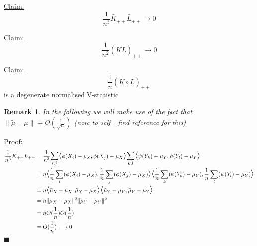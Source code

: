 \documentclass{article}
\newtheorem*{remark}{Remark}
\newenvironment{claim}[1]{\par\noindent\underline{Claim:}\space#1}{}
\newenvironment{claimproof}[1]{\par\noindent\underline{Proof:}\space#1}{\hfill $\blacksquare$}
\begin{document}
\begin{claim}[1]
\[\frac{1}{n^3}\bar{K}_{++}\bar{L}_{++} \longrightarrow 0\]
\end{claim}

\begin{claim}[2]
\[\frac{1}{n^2}(\bar{K}\bar{L})_{++} \longrightarrow 0\]
\end{claim}


\begin{claim}[3]
\[\frac{1}{n}(\bar{K}\circ \bar{L})_{++}\]
is a degenerate normalised V-statistic
\end{claim}

\begin{remark}
In the following we will make use of the fact that $\|\tilde{\mu} - \mu\| = O(\frac{1}{\sqrt{n}})$ (note to self - find reference for this)
\end{remark}

\begin{claimproof}[1]
\begin{align*}
 \frac{1}{n^3}\bar{K}_{++}\bar{L}_{++} & =  \frac{1}{n^3}\mathlarger{\mathlarger{\sum}}_{i,j}\mathlarger{\mathlarger{\langle}} \phi(X_i) - \mu_X , \phi(X_j) - \mu_X \mathlarger{\mathlarger{\rangle}} \mathlarger{\mathlarger{\sum}}_{k,l}\mathlarger{\mathlarger{\langle}} \psi(Y_k) - \mu_Y , \psi(Y_l) - \mu_Y \mathlarger{\mathlarger{\rangle}} \\ &
 = n\mathlarger{\mathlarger{\langle}} \frac{1}{n}\sum_i(\phi(X_i) - \mu_X) , \frac{1}{n}\sum_j(\phi(X_j) - \mu_X) \mathlarger{\mathlarger{\rangle}} \mathlarger{\mathlarger{\langle}} \frac{1}{n}\sum_k(\psi(Y_k) - \mu_Y) , \frac{1}{n}\sum_l(\psi(Y_l) - \mu_Y) \mathlarger{\mathlarger{\rangle}}\\&
 = n \mathlarger{\mathlarger{\langle}} \bar{\mu}_X - \mu_X , \tilde{\mu}_X - \mu_X \mathlarger{\mathlarger{\rangle}} \mathlarger{\mathlarger{\langle}} \tilde{\mu}_Y - \mu_Y , \tilde{\mu}_Y - \mu_Y \mathlarger{\mathlarger{\rangle}} \\ &
= n\|\tilde{\mu}_X - \mu_X\|^2 \|\tilde{\mu}_Y - \mu_Y\|^2\\ &= nO(\frac{1}{n})O(\frac{1}{n}) \\&= O(\frac{1}{n}) \longrightarrow 0
\end{align*}
\end{claimproof}
\end{document}
